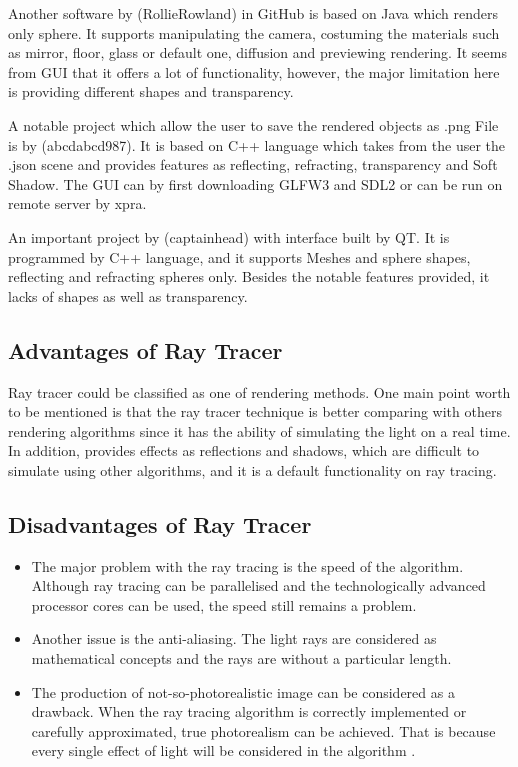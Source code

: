 \documentclass{article}
\begin{document}
Another software by (RollieRowland) in GitHub is based on Java which renders only sphere. It supports manipulating the camera, costuming the materials such as mirror, floor, glass or default one, diffusion and previewing rendering. It seems from GUI that it offers a lot of functionality, however, the major limitation here is providing different shapes and transparency. \cite{8}

A notable project which allow the user to save the rendered objects as .png File is by (abcdabcd987). It is based on C++ language which takes from the user the .json scene and provides features as reflecting, refracting, transparency and Soft Shadow. The GUI can by first downloading GLFW3 and SDL2 or can be run on remote server by xpra. \cite{9}

An important project by (captainhead) with interface built by QT. It is programmed by C++ language, and it supports Meshes and sphere shapes, reflecting and refracting spheres only. Besides the notable features provided, it lacks of shapes as well as transparency. \cite{10}

\subsection{Advantages of Ray Tracer}

Ray tracer could be classified as one of rendering methods. One main point worth to be mentioned is that the ray tracer technique is better comparing with others rendering algorithms since it has the ability of simulating the light on a real time. In addition, provides effects as reflections and shadows, which are difficult to simulate using other algorithms, and it is a default functionality on ray tracing. \cite{13}

\subsection{Disadvantages of Ray Tracer}
\begin{itemize}
    \item The major problem with the ray tracing is the speed of the algorithm. Although ray tracing can be parallelised and the technologically advanced processor cores can be used, the speed still remains a problem. \cite{14}  
\item	Another issue is the anti-aliasing. The light rays are considered as mathematical concepts and the rays are without a particular length. \cite{14}
\item	The production of not-so-photorealistic image can be considered as a drawback. When the ray tracing algorithm is correctly implemented or carefully approximated, true photorealism can be achieved. That is because every single effect of light will be considered in the algorithm \cite{13}.
\end{itemize}
\end{document}

